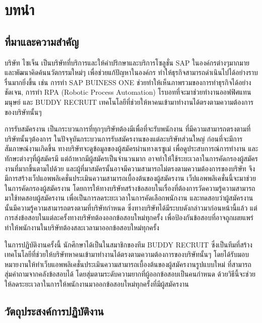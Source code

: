 \chapter{บทนำ}
\label{chapter:introduction}

\section{ที่มาและความสำคัญ}

บริษัท ไซเจ็น เป็นบริษัทที่บริการและให้คำปริกษาและบริการโซลูชั่น SAP ในองค์กรต่างๆมากมาย และพัฒนาคิดค้นนวัตกรรมใหม่ๆ เพื่อช่วยแก้ปัญหาในองค์กร ทำให้ธุรกิจสามารถดำเนินไปได้อย่างราบรื่นมากยิ่งขึ้น เช่น การทำ SAP BUINESS ONE ช่วยทำให้เห็นภาพรวมของการทำธุรกิจได้อย่างชัดเจน,  การทำ RPA (Robotic Process Automation) โรบอทที่จะมาช่วยทำงานออฟฟิศแทนมนุษย์ และ BUDDY RECRUIT เทคโนโลยีที่ช่วยให้หาคนเข้ามาทำงานได้ตรงตามความต้องการของบริษัทนั้นๆ

การรับสมัครงาน เป็นกระบวนการที่ทุกๆบริษัทต้องมีเพื่อที่จะรับพนักงาน ที่มีความสามารถตรงตามที่บริษัทนั้นๆต้องการ ในปัจจุบันกระบวนการรับสมัครงานของแต่ละบริษัทส่วนใหญ่ ก่อนที่จะมีการสัมภาษณ์งานเกิดขึ้น ทางบริษัทจะดูข้อมูลของผู้สมัครผ่านทางเรซูเม่ เพื่อดูประสบการณ์การทำงาน และทักษะต่างๆที่ผู้สมัครมี แต่ถ้าหากมีผู้สมัครเป็นจำนวนมาก อาจทำให้ใช้ระยะเวลาในการคัดกรองผู้สมัครงานที่มากขึ้นตามไปด้วย และผู้ที่มาสมัครนั้นอาจมีความสามารถไม่ตรงตามความต้องการของบริษัท จึงมีการสร้างเว็ปแอพพลิเคชั่นประเมินความสามารถเบื้องต้นของผู้สมัครงาน เว็ปแอพพลิเคชั่นนี้จะมาช่วยในการคัดกรองผู้สมัครงาน โดยการให้ทางบริษัทสร้างข้อสอบในเรื่องที่ต้องการวัดความรู้ความสามารถ มาใช้ทดสอบผู้สมัครงาน เพื่อเป็นการลดระยะเวลาในการคัดเลือกพนักงาน และทดสอบว่าผู้สมัครงานนั้นมีความรู้ความสามารถตรงตามที่บริษัทกำหนด ซึ่งทางบริษัทได้มีระบบดังกล่าวมาก่อนหน้านี้แล้ว แต่การส่งข้อสอบในแต่ละครั้งทางบริษัทต้องออกข้อสอบใหม่ทุกครั้ง เพื่อป้องกันข้อสอบที่อาจถูกเผยแพร่ ทำให้พนักงานในบริษัทต้องสละเวลามาออกข้อสอบใหม่ทุกครั้ง

ในการปฏิบัติงานครั้งนี้ นักศึกษาได้เป็นในสมาชิกของทีม BUDDY RECRUIT ซึ่งเป็นทีมที่สร้างเทคโนโลยีที่ช่วยให้บริษัทหาคนเข้ามาทำงานได้ตรงตามความต้องการของบริษัทนั้นๆ  โดยได้รับมอบหมายงานให้ทำเว็บแอพพลิเคชั่นประเมินความสามารถเบื้องต้นของผู้สมัครงานรูปแบบใหม่ ที่สามารถสุ่มคำถามจากคลังข้อสอบได้ โดยสุ่มตามระดับความยากที่ผู้ออกข้อสอบเป็นคนกำหนด ด้วยวิธีนี้จะช่วยให้ลดระยะเวลาในการให้พนักงานมาออกข้อสอบใหม่ทุกครั้งที่มีผู้สมัครงาน

\section{วัตถุประสงค์การปฏิบัติงาน}

